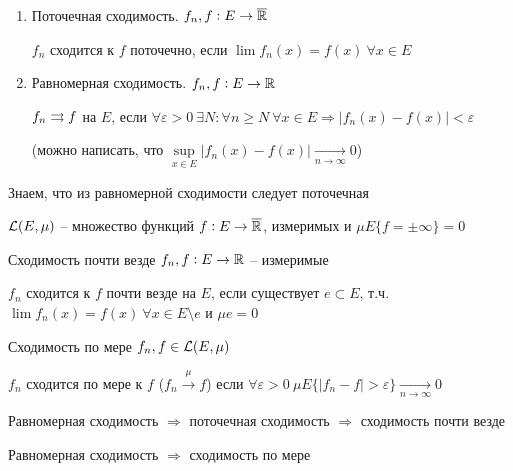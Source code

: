 \documentclass[12pt]{article}
\begin{document}
\begin{Reminder}{}
    \begin{enumerate}
        \item Поточечная сходимость. $f_n, f : E \to \overline{\mathbb R}$
        
        $f_n$ сходится к $f$ поточечно, если $\lim f_n(x) = f(x)\ \forall x \in E$

        \item Равномерная сходимость. $f_n, f : E \to \mathbb R$
        
        $f_n \rightrightarrows f$ на $E$, если $\forall \varepsilon > 0\ \exists N : \forall n \geq N\ \forall x \in E \Rightarrow |f_n(x) - f(x)| < \varepsilon$ 
        
        (можно написать, что $\sup\limits_{x \in E} |f_n(x) - f(x)| \xrightarrow[n \to \infty]{} 0$)
    \end{enumerate}
\end{Reminder}

\begin{Remark}{}
    Знаем, что из равномерной сходимости следует поточечная
\end{Remark}

\begin{declar}{}
    $\mathcal{L}(E, \mu)$ -- множество функций $f : E \to \overline{\mathbb R}$, измеримых и $\mu E\{f = \pm \infty\} = 0$
\end{declar}

\begin{defin}{Сходимость почти везде}
    $f_n, f : E \to \mathbb R$ -- измеримые 

    $f_n$ сходится к $f$ почти везде на $E$, если существует $e \subset E$, т.ч. $\lim f_n(x) = f(x)\ \forall x \in E \setminus e$ и $\mu e = 0$
\end{defin}

\begin{defin}{Сходимость по мере}
    $f_n, f \in \mathcal{L}(E, \mu)$

    $f_n$ сходится по мере к $f$ ($f_n \xrightarrow[]{\mu} f$) если $\forall \varepsilon > 0\ \mu E\{|f_n - f| > \varepsilon\} \xrightarrow[n \to \infty]{} 0$
\end{defin}

\begin{Remark}{}
    Равномерная сходимость $\Rightarrow$ поточечная сходимость $\Rightarrow$ сходимость почти везде

    Равномерная сходимость $\Rightarrow$ сходимость по мере
\end{Remark}
\end{document}
